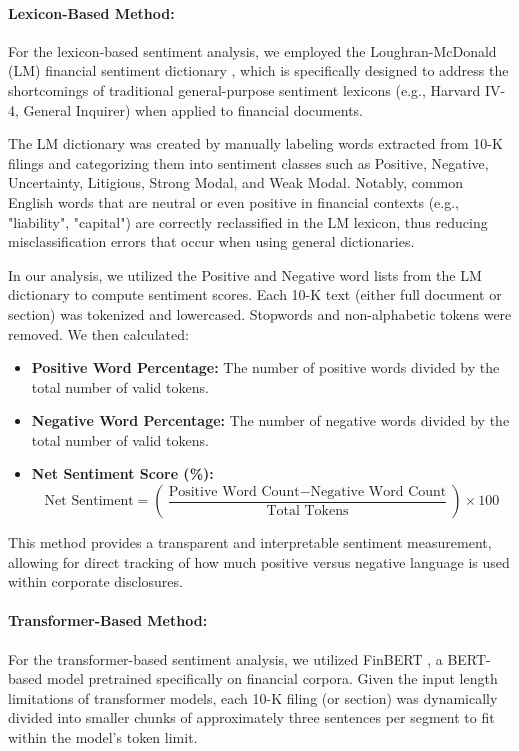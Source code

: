\documentclass[12pt]{article}
\begin{document}
\paragraph{Lexicon-Based Method:} 
For the lexicon-based sentiment analysis, we employed the Loughran-McDonald (LM) financial sentiment dictionary \citep{Loughran2011}, which is specifically designed to address the shortcomings of traditional general-purpose sentiment lexicons (e.g., Harvard IV-4, General Inquirer) when applied to financial documents. 

The LM dictionary was created by manually labeling words extracted from 10-K filings and categorizing them into sentiment classes such as Positive, Negative, Uncertainty, Litigious, Strong Modal, and Weak Modal. Notably, common English words that are neutral or even positive in financial contexts (e.g., "liability", "capital") are correctly reclassified in the LM lexicon, thus reducing misclassification errors that occur when using general dictionaries.

In our analysis, we utilized the Positive and Negative word lists from the LM dictionary to compute sentiment scores. Each 10-K text (either full document or section) was tokenized and lowercased. Stopwords and non-alphabetic tokens were removed. We then calculated:

\begin{itemize}
    \item \textbf{Positive Word Percentage:} The number of positive words divided by the total number of valid tokens.
    \item \textbf{Negative Word Percentage:} The number of negative words divided by the total number of valid tokens.
    \item \textbf{Net Sentiment Score (\%):} \[
    \text{Net Sentiment} = \left( \frac{\text{Positive Word Count} - \text{Negative Word Count}}{\text{Total Tokens}} \right) \times 100
    \]
\end{itemize}

This method provides a transparent and interpretable sentiment measurement, allowing for direct tracking of how much positive versus negative language is used within corporate disclosures.

\paragraph{Transformer-Based Method:}
For the transformer-based sentiment analysis, we utilized FinBERT \citep{Araci2019}, a BERT-based model pretrained specifically on financial corpora. Given the input length limitations of transformer models, each 10-K filing (or section) was dynamically divided into smaller chunks of approximately three sentences per segment to fit within the model's token limit. 
\end{document}
